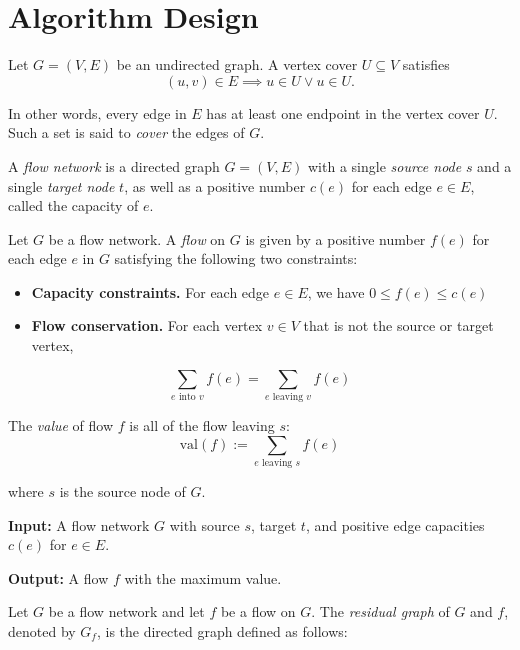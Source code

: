
\section{Algorithm Design}\label{41ab460}

\label{b530c81}

Let $G=(V,E)$ be an undirected graph. A vertex cover $U\subseteq V$ satisfies
$$
	(u,v)\in E\implies u\in U\lor u\in U.
$$

In other words, every edge in $E$ has at least one endpoint in the
vertex cover $U$. Such a set is said to \textit{cover} the edges of
$G$.


A \textit{flow network} is a directed graph $G=(V,E)$ with a single
\textit{source node} $s$ and a single \textit{target node} $t$, as
well as a positive number $c(e)$ for each edge $e\in E$, called the
capacity of $e$.


Let $G$ be a flow network. A \textit{flow} on $G$ is given by a positive
number $f(e)$ for each edge $e$ in $G$ satisfying the following two
constraints:
\begin{itemize}
	\item \textbf{Capacity constraints.} For each edge $e\in E$, we have
	      $0\leq f(e)\leq c(e)$
	\item \textbf{Flow conservation.} For each vertex $v\in V$ that is
	      not the source or target vertex,
\end{itemize}
$$
	\sum_{e\text{ into }v}f(e)=\sum_{e\text{ leaving }v}f(e)
$$

The \textit{value} of flow $f$ is all of the flow leaving $s$:
$$
	\text{val}(f):=\sum_{e\text{ leaving }s}f(e)
$$

where $s$ is the source node of $G$.


\textbf{Input:} A flow network $G$ with source $s$, target $t$, and positive
edge capacities $c(e)$ for $e\in E$.

\textbf{Output:} A flow $f$ with the maximum value.


Let $G$ be a flow network and let $f$ be a flow on $G$. The
\textit{residual graph} of $G$ and $f$, denoted by $G_f$, is the
directed graph defined as follows:

